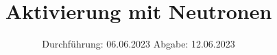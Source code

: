 

\subject{V702}
\title{Aktivierung mit Neutronen}
\date{%
  Durchführung: 06.06.2023
  \hspace{3em}
  Abgabe: 12.06.2023
}



\maketitle
\thispagestyle{empty}
\tableofcontents
\newpage






\printbibliography{}


